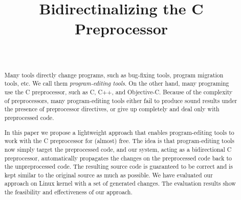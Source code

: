 \documentclass[conference]{IEEEtran}
\begin{document}
\title{Bidirectinalizing the C Preprocessor}

\author{
   \\
}

\maketitle
\begin{abstract}


  Many tools directly change programs, such as bug-fixing tools, program migration tools, etc. We call them \emph{program-editing tools}. On the other hand, many programing use the C preprocessor, such as C, C++, and Objective-C. Because of the complexity of preprocessors, many program-editing tools either fail to produce sound results under the presence of preprocessor directives, or give up completely and deal only with preprocessed code.
  
  In this paper we propose a lightweight approach that enables program-editing tools to work with the C preprocessor for (almost) free. The idea is that program-editing tools now simply target the preprocessed code, and our system, acting as a bidirectional C preprocessor, automatically propagates the changes on the preprocessed code back to the unpreprocessed code. The resulting source code is guaranteed to be correct and is kept similar to the original source as much as possible. We have evaluated our approach on Linux kernel with a set of generated changes. The evaluation results show the feasibility and effectiveness of our approach.
\end{abstract}
\end{document}
